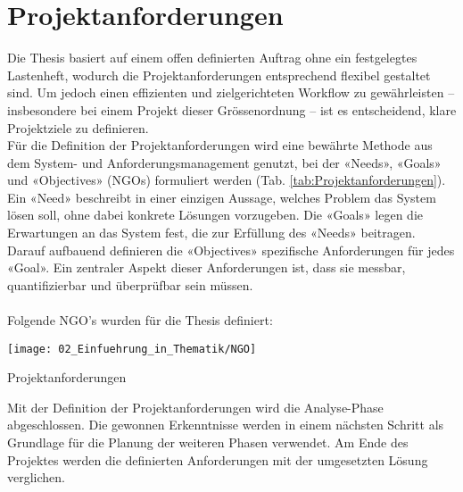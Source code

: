 \section{Projektanforderungen} \label{Projektanforderungen}

	Die Thesis basiert auf einem offen definierten Auftrag ohne ein festgelegtes Lastenheft, wodurch die Projektanforderungen entsprechend flexibel gestaltet sind. Um jedoch einen effizienten und zielgerichteten Workflow zu gewährleisten – insbesondere bei einem Projekt dieser Grössenordnung – ist es entscheidend, klare Projektziele zu definieren.
	\\
	Für die Definition der Projektanforderungen wird eine bewährte Methode aus dem System- und Anforderungsmanagement genutzt, bei der «Needs», «Goals» und «Objectives» (NGOs) formuliert werden (Tab. \ref{tab:Projektanforderungen}). Ein «Need» beschreibt in einer einzigen Aussage, welches Problem das System lösen soll, ohne dabei konkrete Lösungen vorzugeben. Die «Goals» legen die Erwartungen an das System fest, die zur Erfüllung des «Needs» beitragen. Darauf aufbauend definieren die «Objectives» spezifische Anforderungen für jedes «Goal». Ein zentraler Aspekt dieser Anforderungen ist, dass sie messbar, quantifizierbar und überprüfbar sein müssen.
	\\
	\\
	Folgende NGO's wurden für die Thesis definiert: 
	
	\begin{table}[h!]
		\centering
		\texttt{[image: 02\_Einfuehrung\_in\_Thematik/NGO]}
		\caption{Projektanforderungen}
		\label{tab:Projektanforderungen}
	\end{table}
	
	Mit der Definition der Projektanforderungen wird die Analyse-Phase abgeschlossen. Die gewonnen Erkenntnisse werden in einem nächsten Schritt als Grundlage für die Planung der weiteren Phasen verwendet. Am Ende des Projektes werden die definierten Anforderungen mit der umgesetzten Lösung verglichen. 